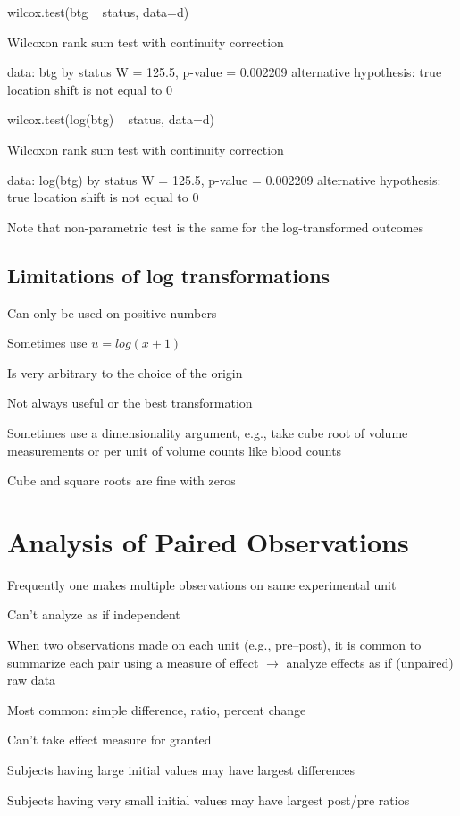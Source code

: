 \begin{Schunk}
\begin{Sinput}
wilcox.test(btg ~ status, data=d)
\end{Sinput}
\begin{Soutput}

	Wilcoxon rank sum test with continuity correction

data:  btg by status
W = 125.5, p-value = 0.002209
alternative hypothesis: true location shift is not equal to 0
\end{Soutput}
\begin{Sinput}
wilcox.test(log(btg) ~ status, data=d)
\end{Sinput}
\begin{Soutput}

	Wilcoxon rank sum test with continuity correction

data:  log(btg) by status
W = 125.5, p-value = 0.002209
alternative hypothesis: true location shift is not equal to 0
\end{Soutput}
\end{Schunk}
  \item Note that non-parametric test is the same for the log-transformed outcomes
\ei


\subsection{Limitations of log transformations}  
\bi
  \item Can only be used on positive numbers
   \bi
    \item Sometimes use $u = log(x+1)$
   \ei
  \item Is very arbitrary to the choice of the origin
  \item Not always useful or the best transformation
  \item Sometimes use a dimensionality argument, e.g., take cube root of volume measurements or per unit of volume counts like blood counts
  \item Cube and square roots are fine with zeros
\ei

\section{Analysis of Paired Observations}  
\bi
\item   Frequently one makes multiple observations on same experimental unit
\item   Can't analyze as if independent
\item   When two observations made on each unit (e.g., pre--post), it is common to summarize each pair using a measure of effect $\rightarrow$ analyze effects as if (unpaired) raw data
\item   Most common: simple difference, ratio, percent change
\item   Can't take effect measure for granted
\item   Subjects having large initial values may have largest differences
\item   Subjects having very small initial values may have largest post/pre ratios
\ei

